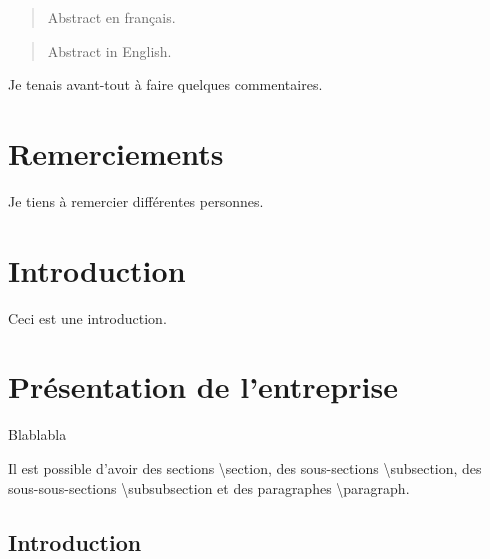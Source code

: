 \documentclass[11pt]{article}
\begin{document}
\tableofcontents
\label{toc}
\clearpage

\printglossary[type=\acronymtype]
\label{acronyms}
\clearpage


\begin{abstract}%
    \label{sec:abstract}
	Abstract en français.
\end{abstract}
\begin{abstract}%
	Abstract in English.
    \clearpage
\end{abstract}
\pagestyle{headings}

\label{sec:avantpropos}
Je tenais avant-tout à faire quelques commentaires.

\section{Remerciements}\label{sec:merci}
Je tiens à remercier différentes personnes.

\section{Introduction}\label{sec:intro}
Ceci est une introduction.

\section{Présentation de l'entreprise}\label{sec:presentation entreprise}

Blablabla

Il est possible d'avoir des sections \textbackslash section, des sous-sections \textbackslash subsection, des sous-sous-sections \textbackslash subsubsection et des paragraphes \textbackslash paragraph.

\subsection{Introduction}
\end{document}
